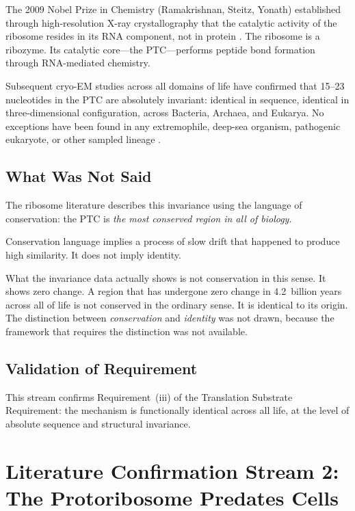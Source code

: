 \documentclass[11pt]{article}
\theoremstyle{definition}
\begin{document}
The 2009 Nobel Prize in Chemistry (Ramakrishnan, Steitz, Yonath)
established through high-resolution X-ray crystallography that
the catalytic activity of the ribosome resides in its RNA component,
not in protein \cite{Nobel2009}.
The ribosome is a ribozyme.
Its catalytic core---the PTC---performs peptide bond formation
through RNA-mediated chemistry.

Subsequent cryo-EM studies across all domains of life have confirmed
that 15--23 nucleotides in the PTC are absolutely invariant:
identical in sequence, identical in three-dimensional configuration,
across Bacteria, Archaea, and Eukarya.
No exceptions have been found in any extremophile, deep-sea organism,
pathogenic eukaryote, or other sampled lineage \cite{Polikanov2012}.

\subsection{What Was Not Said}

The ribosome literature describes this invariance using the language
of conservation: the PTC is \emph{the most conserved region in all
of biology}.

Conservation language implies a process of slow drift that happened
to produce high similarity.
It does not imply identity.

What the invariance data actually shows is not conservation in this
sense. It shows zero change.
A region that has undergone zero change in 4.2~billion years across
all of life is not conserved in the ordinary sense.
It is identical to its origin.
The distinction between \emph{conservation} and \emph{identity} was
not drawn, because the framework that requires the distinction was
not available.

\subsection{Validation of Requirement}

This stream confirms Requirement~(iii) of the Translation Substrate
Requirement: the mechanism is functionally identical across all life,
at the level of absolute sequence and structural invariance.

\section{Literature Confirmation Stream 2:\\
The Protoribosome Predates Cells}
\label{sec:literature2}
\end{document}
